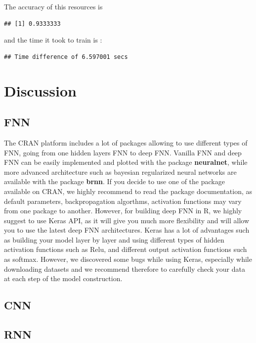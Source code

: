 \documentclass[letter,8pt]{article}\usepackage[]{graphicx}\usepackage[]{color}
\makeatletter
\newenvironment{kframe}{%
 \def\at@end@of@kframe{}%
 \ifinner\ifhmode%
  \def\at@end@of@kframe{\end{minipage}}%
  \begin{minipage}{\columnwidth}%
 \fi\fi%
 \def\FrameCommand##1{\hskip\@totalleftmargin \hskip-\fboxsep
 \colorbox{shadecolor}{##1}\hskip-\fboxsep
     \hskip-\linewidth \hskip-\@totalleftmargin \hskip\columnwidth}%
 \MakeFramed {\advance\hsize-\width
   \@totalleftmargin\z@ \linewidth\hsize
   \@setminipage}}%
 {\par\unskip\endMakeFramed%
 \at@end@of@kframe}
\newenvironment{knitrout}{}{} %
\makeatother
\begin{document}
The accuracy of this resources is
\begin{knitrout}
\color{fgcolor}\begin{kframe}
\begin{verbatim}
## [1] 0.9333333
\end{verbatim}
\end{kframe}
\end{knitrout}
and the time it took to train is :
\begin{knitrout}
\color{fgcolor}\begin{kframe}
\begin{verbatim}
## Time difference of 6.597001 secs
\end{verbatim}
\end{kframe}
\end{knitrout}


\section{Discussion}
\subsection{FNN}
The CRAN platform includes a lot of packages allowing to use different types of FNN, going from one hidden layers FNN to deep FNN. Vanilla FNN and deep FNN can be easily implemented and plotted with the package \textbf{neuralnet}, while more advanced architecture such as bayesian regularized neural networks are available with the package \textbf{brnn}. If you decide to use one of the package available on CRAN, we highly recommend to read the package documentation, as default parameters, backpropagation algorthms, activation functions may vary from one package to another. However, for building deep FNN in R, we highly suggest to use Keras API, as it will give you much more flexibility and will allow you to use the latest deep FNN architectures. Keras has a lot of advantages such as building your model layer by layer and using different types of hidden activation functions such as Relu, and different output activation functions such as softmax. However, we discovered some bugs while using Keras, especially while downloading datasets and we recommend therefore to carefully check your data at each step of the model construction.
\subsection{CNN}
\subsection{RNN}

\newpage
\pagestyle{plain}

\end{document}
